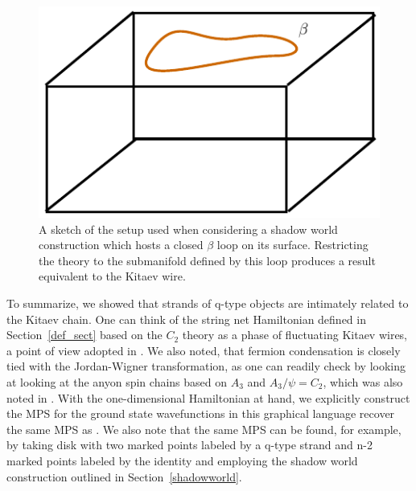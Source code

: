 \begin{figure}
\centering
\includegraphics{box_beta_loop.pdf}
\caption{ \label{box_beta_loop} A sketch of the setup used when considering a shadow world construction which hosts a closed $\beta$ loop on its surface. Restricting the theory to the submanifold defined by this loop produces a result equivalent to the Kitaev wire. }
\end{figure}

To summarize, we showed that strands of q-type objects are intimately related to the Kitaev chain. 
One can think of the string net Hamiltonian defined in Section~\ref{def_sect} based on the $C_2$ theory as a phase of fluctuating Kitaev wires, a point of view adopted in \cite{tarantino2016,ware2016,kapustin2017}.
We also noted, that fermion condensation is closely tied with the Jordan-Wigner transformation, as one can readily check by looking at looking at the anyon spin chains based on $A_3$ and $A_3/\psi = C_2$, which was also noted in \cite{Kapustin again?}
.
With the one-dimensional Hamiltonian at hand, we explicitly construct the MPS for the ground state wavefunctions in this graphical language recover the same MPS as \cite{fidkowski2011,turzillo2016,bultinck2017b}.
We also note that the same MPS can be found, for example, by taking disk with two marked points labeled by a q-type strand and n-2 marked points labeled by the identity and employing the shadow world construction outlined in Section~\ref{shadowworld}.





